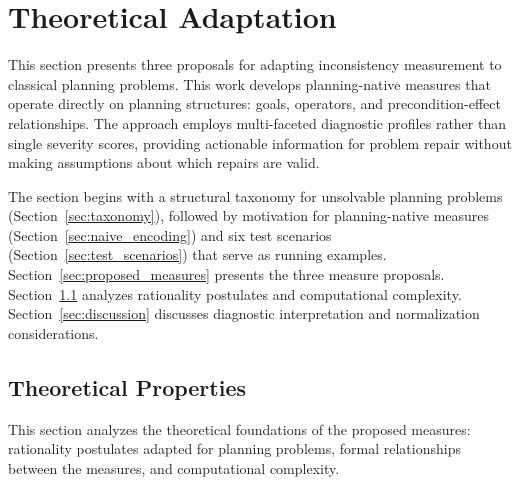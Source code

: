 \section{Theoretical Adaptation}
\label{sec:theoretical_adaptation}

This section presents three proposals for adapting inconsistency measurement to classical planning problems. This work develops planning-native measures that operate directly on planning structures: goals, operators, and precondition-effect relationships. The approach employs multi-faceted diagnostic profiles rather than single severity scores, providing actionable information for problem repair without making assumptions about which repairs are valid.

The section begins with a structural taxonomy for unsolvable planning problems (Section~\ref{sec:taxonomy}), followed by motivation for planning-native measures (Section~\ref{sec:naive_encoding}) and six test scenarios (Section~\ref{sec:test_scenarios}) that serve as running examples. Section~\ref{sec:proposed_measures} presents the three measure proposals. Section~\ref{sec:theoretical_properties} analyzes rationality postulates and computational complexity. Section~\ref{sec:discussion} discusses diagnostic interpretation and normalization considerations.









\subsection{Theoretical Properties}
\label{sec:theoretical_properties}

This section analyzes the theoretical foundations of the proposed measures: rationality postulates adapted for planning problems, formal relationships between the measures, and computational complexity.








